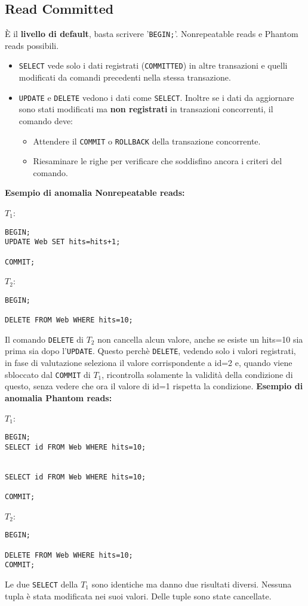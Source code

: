\documentclass[a4paper, 10pt, titlepage]{article}
\begin{document}
		
		\subsection{Read Committed}
			È il \textbf{livello di default}, basta scrivere '\lstinline|BEGIN;|'. Nonrepeatable reads e Phantom reads possibili.
			\begin{itemize}
				\item \lstinline|SELECT| vede solo i dati registrati (\lstinline|COMMITTED|) in altre transazioni e quelli modificati da comandi precedenti nella stessa transazione.
				\item \lstinline|UPDATE| e \lstinline|DELETE| vedono i dati come \lstinline|SELECT|. Inoltre se i dati da aggiornare sono stati modificati ma \textbf{non registrati} in transazioni concorrenti, il comando deve:
				\begin{itemize}
					\item Attendere il \lstinline|COMMIT| o \lstinline|ROLLBACK| della transazione concorrente.
					\item Riesaminare le righe per verificare che soddisfino ancora i criteri del comando.
				\end{itemize}
			\end{itemize} \medskip
			\textbf{Esempio di anomalia Nonrepeatable reads:}
			\begin{multicols}{2}
				\noindent
				$ T_1 $:
				\begin{lstlisting}
BEGIN;
UPDATE Web SET hits=hits+1;

COMMIT;
				\end{lstlisting}
				\columnbreak
				$ T_2 $:
				\begin{lstlisting}
BEGIN;

DELETE FROM Web WHERE hits=10;

				\end{lstlisting}
			\end{multicols}
Il comando \lstinline|DELETE| di $T_2$ non cancella alcun valore, anche se esiste un hits=10 sia prima sia dopo l'\lstinline|UPDATE|. Questo perchè \lstinline|DELETE|, vedendo solo i valori registrati, in fase di valutazione seleziona il valore corrispondente a id=2 e, quando viene sbloccato dal \lstinline|COMMIT| di $T_1$, ricontrolla solamente la validità della condizione di questo, senza vedere che ora il valore di id=1 rispetta la condizione. \newpage
\noindent
\textbf{Esempio di anomalia Phantom reads:}
			\begin{multicols}{2}
				\noindent
				$ T_1 $:
				\begin{lstlisting}
BEGIN;
SELECT id FROM Web WHERE hits=10;


SELECT id FROM Web WHERE hits=10;

COMMIT;
				\end{lstlisting}
				\columnbreak
				$ T_2 $:
				\begin{lstlisting}
BEGIN;

DELETE FROM Web WHERE hits=10;
COMMIT;
				\end{lstlisting}
			\end{multicols}
			Le due \lstinline|SELECT| della $T_1$ sono identiche ma danno due risultati diversi. Nessuna tupla è stata modificata nei suoi valori. Delle tuple sono state cancellate.
			
\end{document}
